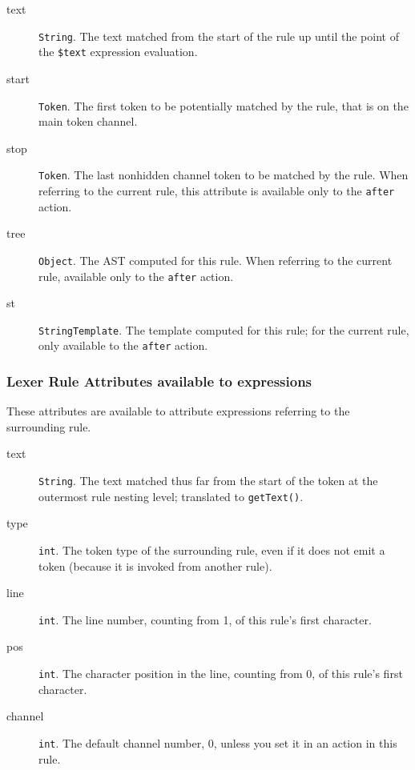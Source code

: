 \begin{description}
\item[text] \verb=String=.
The text matched from the start of the rule
up until the point of the \verb=$text= expression evaluation.

\item[start] \verb=Token=.
The first token to be potentially matched by the rule,
that is on the main token channel.

\item[stop] \verb=Token=.
The last nonhidden channel token to be matched by the rule.
When referring to the current rule,
this attribute is available only to the \verb=after= action.

\item[tree] \verb=Object=.
The AST computed for this rule.
When referring to the current rule, available only to the \verb=after= action.

\item[st] \verb=StringTemplate=.
The template computed for this rule;
for the current rule, only available to the \verb=after= action.
\end{description}

\subsubsection{Lexer Rule Attributes available to expressions}

These attributes are available to attribute expressions
referring to the surrounding rule.

\begin{description}
\item[text] \verb=String=.
The text matched thus far from the start of the token
at the outermost rule nesting level; translated to \verb=getText()=.

\item[type] \verb=int=.
The token type of the surrounding rule,
even if it does not emit a token (because it is invoked from another rule).

\item[line] \verb=int=.
The line number, counting from 1, of this rule's first character.

\item[pos] \verb=int=.
The character position in the line, counting from 0,
of this rule's first character.

\item[channel] \verb=int=.
The default channel number, 0, unless you set it in an action in this rule.
\end{description}

